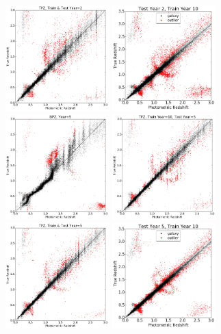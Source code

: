 \documentclass[DM,lsstdraft,toc]{lsstdoc}
\begin{document}
\begin{figure}
\begin{center}
\includegraphics[width=4.0cm]{figures/TPZ_Euclid_2Y2_tzpz.png}
\includegraphics[width=4.0cm]{figures/CM_10Y2_tzpz.png}
\includegraphics[width=4.0cm]{figures/BPZ_Euclid_Y5_tzpz.png}
\includegraphics[width=4.0cm]{figures/TPZ_Euclid_10Y5_tzpz.png}
\includegraphics[width=4.0cm]{figures/TPZ_Euclid_5Y5_tzpz.png}
\includegraphics[width=4.0cm]{figures/CM_10Y5_tzpz.png}

\end{center}
\end{figure}
\end{document}
